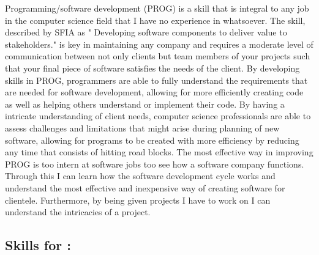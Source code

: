 \documentclass[a4paper, 11pt]{report}
\begin{document}
Programming/software development (PROG)\cite{SFIA} is a skill that is integral to any job in the computer science field that I have no experience in whatsoever. The skill, described by SFIA as " Developing software components to deliver value to stakeholders." is key in maintaining any company and requires a moderate level of communication between not only clients but team members of your projects such that your final piece of software satisfies the needs of the client. By developing skills in PROG, programmers are able to fully understand the requirements that are needed for software development, allowing for more efficiently creating code as well as helping others understand or implement their code. By having a intricate understanding of client needs, computer science professionals are able to assess challenges and limitations that might arise during planning of new software, allowing for programs to be created with more efficiency by reducing any time that consists of hitting road blocks. The most effective way in improving PROG is too intern at software jobs too see how a software company functions. Through this I can learn how the software development cycle works and understand the most effective and inexpensive way of creating software for clientele. Furthermore, by being given projects I have to work on I can understand the intricacies of a project.

\subsection{Skills for \majD: \studD}
\end{document}
